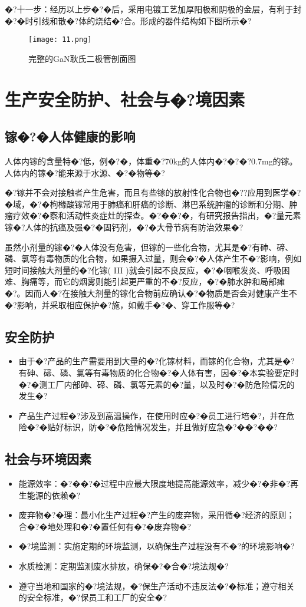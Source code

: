 \documentclass{zjureport}
\begin{document}
�?十一步：经历以上步�?�后，采用电镀工艺加厚阳极和阴极的金层，有利于封�?�时引线和散�?体的烧结�?合。形成的器件结构如下图所示�?
\begin{figure}[htbp]
	\centering
	\texttt{[image: 11.png]}
	\caption{完整的GaN耿氏二极管剖面图}
\end{figure}
\section{生产安全防护、社会与�?境因素}
\subsection{镓�?�人体健康的影响}
人体内镓的含量特�?低，例�?�，体重�?70kg的人体内�?�?�?0.7mg的镓。人体内的镓�?能来源于水源、�?�物等�?

�?镓并不会对接触者产生危害，而且有些镓的放射性化合物也�??应用到医学�?�域，�?�枸橼酸镓常用于肺癌和肝癌的诊断、淋巴系统肿瘤的诊断和分期、肿瘤疗效�?�察和活动性炎症灶的探查。�?��?�，有研究报告指出，�?量元素镓�?人体的抗癌及强�?�固钙剂，�?�大骨节病有防治效果�?

虽然小剂量的镓�?�人体没有危害，但镓的一些化合物，尤其是�?有砷、碲、磷、氯等有毒物质的化合物，如果摄入过量，则会�?�人体产生不�?影响，例如短时间接触大剂量的�?化镓( III )就会引起不良反应，�?�咽喉发炎、呼吸困难、胸痛等，而它的烟雾则能引起更严重的不�?反应，�?�肺水肿和局部瘫�?。因而人�?在接触大剂量的镓化合物前应确认�?�物质是否会对健康产生不�?影响，并采取相应保护�?施，如戴手�?�、穿工作服等�?
\subsection{安全防护}
\begin{itemize}
	\item 由于�?产品的生产需要用到大量的�?化镓材料，而镓的化合物，尤其是�?有砷、碲、磷、氯等有毒物质的化合物�?�人体有害，因�?�本实验要定时�?�测工厂内部砷、碲、磷、氯等元素的�?量，以及时�?�防危险情况的发生�?
	\item 产品生产过程�?涉及到高温操作，在使用时应�?�员工进行培�?，并在危险�?�贴好标识，防�?�危险情况发生，并且做好应急�?��?��?
\end{itemize}
\subsection{社会与环境因素}
\begin{itemize}
	\item 能源效率：�?��?�过程中应最大限度地提高能源效率，减少�?�非�?再生能源的依赖�?
	\item 废弃物�?�理：最小化生产过程�?产生的废弃物，采用循�?经济的原则；合�?�地处理和�?�置任何有�?�废弃物�?
	\item �?境监测：实施定期的环境监测，以确保生产过程没有不�?的环境影响�?
	\item 水质检测：定期监测废水排放，确保�?�合�?境法规�?
	\item 遵守当地和国家的�?境法规，�?保生产活动不违反法�?�标准；遵守相关的安全标准，�?保员工和工厂的安全�?
\end{itemize}
\end{document}
